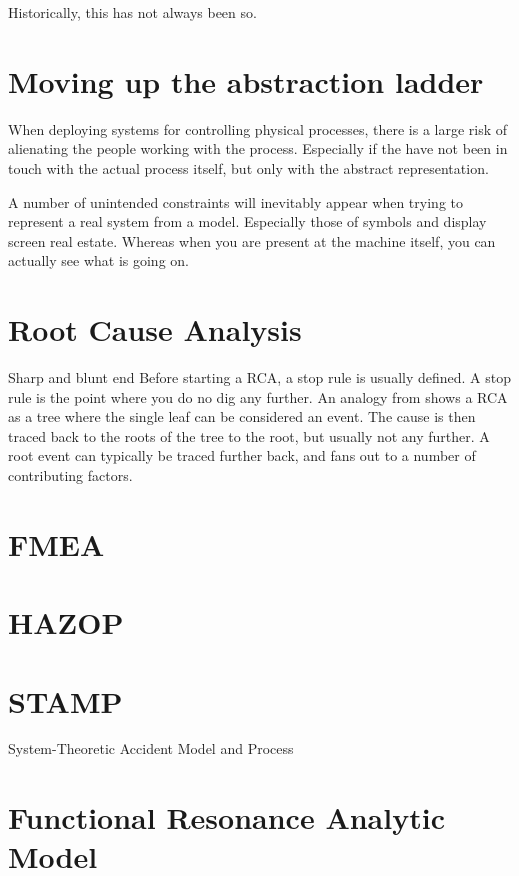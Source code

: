Historically, this has not always been so.
\section{Moving up the abstraction ladder}
When deploying systems for controlling physical processes, there is a large risk of alienating the people working with the process. Especially if the have not been in touch with the actual process itself, but only with the abstract representation.

A number of unintended constraints will inevitably appear when trying to represent a real system from a model. Especially those of symbols and display screen real estate. Whereas when you are present at the machine itself, you can actually see what is going on.

\cite{hollnagel2005joint}%

\section{Root Cause Analysis}
Sharp and blunt end
Before starting a RCA, a stop rule is usually defined. A stop rule is the point where you do no dig any further. An analogy from \cite{hollnagel2004barriers} shows a RCA as a tree where the single leaf can be considered an event. The cause is then traced back to the roots of the tree to the root, but usually not any further. A root event can typically be traced further back, and fans out to a number of contributing factors.

\section{FMEA}

\section{HAZOP}

\section{STAMP}
System-Theoretic Accident Model and Process
\section{Functional Resonance Analytic Model}


